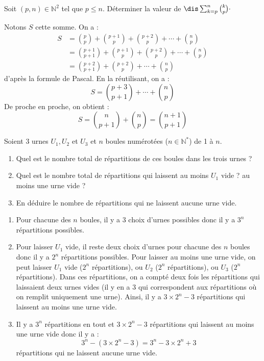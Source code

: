 \documentclass[a4paper,10pt]{report}
\begin{document}
\begin{Exercice}{} Soit $(p, n) \in \mathbb{N}^2$ tel que $p \leq n$. Déterminer la valeur de $\dis\sum_{k=p}^n{k\choose p} \cdot$

\end{Exercice}

\corr Notons $S$ cette somme. On a :
\begin{align*}
S & = \binom{p}{p} + \binom{p+1}{p} + \binom{p+2}{p} + \cdots + \binom{n}{p} \\
& = \binom{p+1}{p+1} + \binom{p+1}{p} + \binom{p+2}{p} + \cdots + \binom{n}{p} \\
& =  \binom{p+2}{p+1} + \binom{p+2}{p} + \cdots + \binom{n}{p} 
\end{align*}
d'après la formule de Pascal. En la réutilisant, on a :
$$ S = \binom{p+3}{p+1} +  \cdots + \binom{n}{p} $$
De proche en proche, on obtient :
$$ S = \binom{n}{p+1}  + \binom{n}{p} = \binom{n+1}{p+1} $$

\begin{Exercice}{}Soient $3$ urnes $U_1,U_2$ et $U_3$ et $n$ boules numérotées ($n \in \mathbb{N}^*$) de 1 à $n$.
\begin{enumerate}
\item Quel est le nombre total de répartitions de ces boules dans les trois urnes ?
\item Quel est le nombre total de répartitions qui laissent au moins $U_1$ vide ? au moins une urne vide ?
\item En déduire le nombre de répartitions qui ne laissent aucune urne vide.
\end{enumerate}
\end{Exercice}

\corr 

\begin{enumerate}
\item Pour chacune des $n$ boules, il y a $3$ choix d'urnes possibles donc il y a $3^n$ répartitions possibles.
\item Pour laisser $U_1$ vide, il reste deux choix d'urnes pour chacune des $n$ boules donc il y a $2^n$ répartitions possibles. Pour laisser au moins une urne vide, on peut laisser $U_1$ vide ($2^n$ répartitions), ou $U_2$  ($2^n$ répartitions), ou $U_3$  ($2^n$ répartitions). Dans ces répartitions, on a compté deux fois les répartitions qui laissaient deux urnes vides (il y en a $3$ qui correspondent aux répartitions où on remplit uniquement une urne). Ainsi, il y a $3 \times 2^n - 3$ répartitions qui laissent au moins une urne vide.
\item Il y a $3^n$ répartitions en tout et $3 \times 2^n - 3$ répartitions qui laissent au moins une urne vide donc il y a :
$$ 3^n - (3 \times 2^n - 3) = 3^n - 3 \times 2^n + 3$$
répartitions qui ne laissent aucune urne vide.
\end{enumerate}
\end{document}

